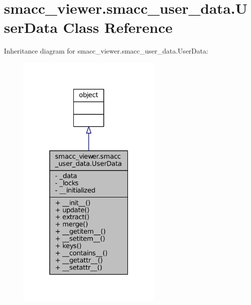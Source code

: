 \hypertarget{classsmacc__viewer_1_1smacc__user__data_1_1UserData}{}\section{smacc\+\_\+viewer.\+smacc\+\_\+user\+\_\+data.\+User\+Data Class Reference}
\label{classsmacc__viewer_1_1smacc__user__data_1_1UserData}


Inheritance diagram for smacc\+\_\+viewer.\+smacc\+\_\+user\+\_\+data.\+User\+Data\+:
\nopagebreak
\begin{figure}[H]
\begin{center}
\leavevmode
\includegraphics[width=199pt]{classsmacc__viewer_1_1smacc__user__data_1_1UserData__inherit__graph}
\end{center}
\end{figure}


